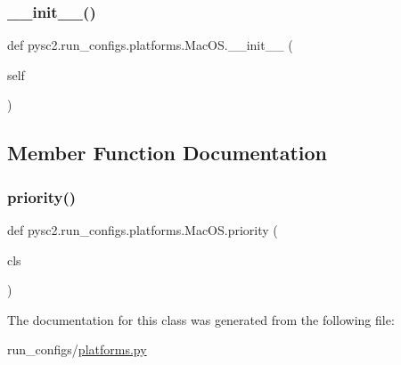 \subsubsection{\texorpdfstring{\+\_\+\+\_\+init\+\_\+\+\_\+()}{\_\_init\_\_()}}
{\footnotesize\ttfamily def pysc2.\+run\+\_\+configs.\+platforms.\+Mac\+O\+S.\+\_\+\+\_\+init\+\_\+\+\_\+ (\begin{DoxyParamCaption}\item[{}]{self }\end{DoxyParamCaption})}



\subsection{Member Function Documentation}
\mbox{\label{classpysc2_1_1run__configs_1_1platforms_1_1_mac_o_s_a217e84d138a4a2c3e471f37177564c23}} 
\subsubsection{\texorpdfstring{priority()}{priority()}}
{\footnotesize\ttfamily def pysc2.\+run\+\_\+configs.\+platforms.\+Mac\+O\+S.\+priority (\begin{DoxyParamCaption}\item[{}]{cls }\end{DoxyParamCaption})}



The documentation for this class was generated from the following file\+:\begin{DoxyCompactItemize}
\item 
run\+\_\+configs/\mbox{\hyperlink{platforms_8py}{platforms.\+py}}\end{DoxyCompactItemize}
